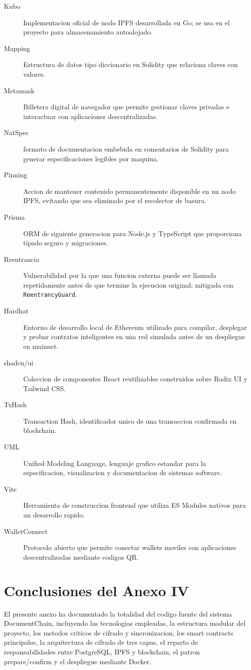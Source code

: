 \documentclass[11pt, a4paper]{article}
\begin{document}
\begin{description}
    \item[Kubo] Implementacion oficial de nodo IPFS desarrollada en Go; se usa en el proyecto para almacenamiento autoalojado.
    \item[Mapping] Estructura de datos tipo diccionario en Solidity que relaciona claves con valores.
    \item[Metamask] Billetera digital de navegador que permite gestionar claves privadas e interactuar con aplicaciones descentralizadas.
    \item[NatSpec] formato de documentacion embebida en comentarios de Solidity para generar especificaciones legibles por maquina.
    \item[Pinning] Accion de mantener contenido permanentemente disponible en un nodo IPFS, evitando que sea eliminado por el recolector de basura.
    \item[Prisma] ORM de siguiente generacion para Node.js y TypeScript que proporciona tipado seguro y migraciones.
    \item[Reentrancia] Vulnerabilidad por la que una funcion externa puede ser llamada repetidamente antes de que termine la ejecucion original; mitigada con \texttt{ReentrancyGuard}.
    \item[Hardhat] Entorno de desarrollo local de Ethereum utilizado para compilar, desplegar y probar contratos inteligentes en una red simulada antes de un despliegue en mainnet.
    \item[shadcn/ui] Coleccion de componentes React reutilizables construidos sobre Radix UI y Tailwind CSS.
    \item[TxHash] Transaction Hash, identificador unico de una transaccion confirmada en blockchain.
    \item[UML] Unified Modeling Language, lenguaje grafico estandar para la especificacion, visualizacion y documentacion de sistemas software.
    \item[Vite] Herramienta de construccion frontend que utiliza ES Modules nativos para un desarrollo rapido.
    \item[WalletConnect] Protocolo abierto que permite conectar wallets moviles con aplicaciones descentralizadas mediante codigos QR.
\end{description}

\section{Conclusiones del Anexo IV}

El presente anexo ha documentado la totalidad del codigo fuente del sistema DocumentChain, incluyendo las tecnologias empleadas, la estructura modular del proyecto, los metodos criticos de cifrado y sincronizacion, los smart contracts principales, la arquitectura de cifrado de tres capas, el reparto de responsabilidades entre PostgreSQL, IPFS y blockchain, el patron prepare/confirm y el despliegue mediante Docker.
\end{document}
